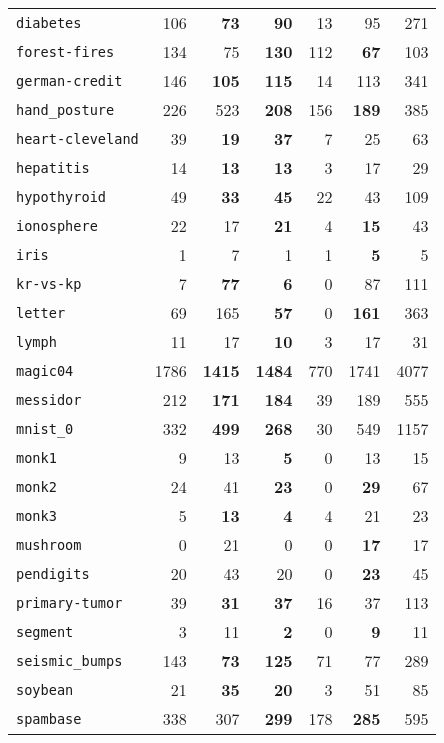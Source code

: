 \begin{tabular}{lrrrrrr}
\texttt{diabetes} & 106 & \textbf{73} & \textbf{90} & 13 & 95 & 271\\
\texttt{forest-fires} & 134 & 75 & \textbf{130} & 112 & \textbf{67} & 103\\
\texttt{german-credit} & 146 & \textbf{105} & \textbf{115} & 14 & 113 & 341\\
\texttt{hand\_posture} & 226 & 523 & \textbf{208} & 156 & \textbf{189} & 385\\
\texttt{heart-cleveland} & 39 & \textbf{19} & \textbf{37} & 7 & 25 & 63\\
\texttt{hepatitis} & 14 & \textbf{13} & \textbf{13} & 3 & 17 & 29\\
\texttt{hypothyroid} & 49 & \textbf{33} & \textbf{45} & 22 & 43 & 109\\
\texttt{ionosphere} & 22 & 17 & \textbf{21} & 4 & \textbf{15} & 43\\
\texttt{iris} & 1 & 7 & 1 & 1 & \textbf{5} & 5\\
\texttt{kr-vs-kp} & 7 & \textbf{77} & \textbf{6} & 0 & 87 & 111\\
\texttt{letter} & 69 & 165 & \textbf{57} & 0 & \textbf{161} & 363\\
\texttt{lymph} & 11 & 17 & \textbf{10} & 3 & 17 & 31\\
\texttt{magic04} & 1786 & \textbf{1415} & \textbf{1484} & 770 & 1741 & 4077\\
\texttt{messidor} & 212 & \textbf{171} & \textbf{184} & 39 & 189 & 555\\
\texttt{mnist\_0} & 332 & \textbf{499} & \textbf{268} & 30 & 549 & 1157\\
\texttt{monk1} & 9 & 13 & \textbf{5} & 0 & 13 & 15\\
\texttt{monk2} & 24 & 41 & \textbf{23} & 0 & \textbf{29} & 67\\
\texttt{monk3} & 5 & \textbf{13} & \textbf{4} & 4 & 21 & 23\\
\texttt{mushroom} & 0 & 21 & 0 & 0 & \textbf{17} & 17\\
\texttt{pendigits} & 20 & 43 & 20 & 0 & \textbf{23} & 45\\
\texttt{primary-tumor} & 39 & \textbf{31} & \textbf{37} & 16 & 37 & 113\\
\texttt{segment} & 3 & 11 & \textbf{2} & 0 & \textbf{9} & 11\\
\texttt{seismic\_bumps} & 143 & \textbf{73} & \textbf{125} & 71 & 77 & 289\\
\texttt{soybean} & 21 & \textbf{35} & \textbf{20} & 3 & 51 & 85\\
\texttt{spambase} & 338 & 307 & \textbf{299} & 178 & \textbf{285} & 595\\

\end{tabular}
